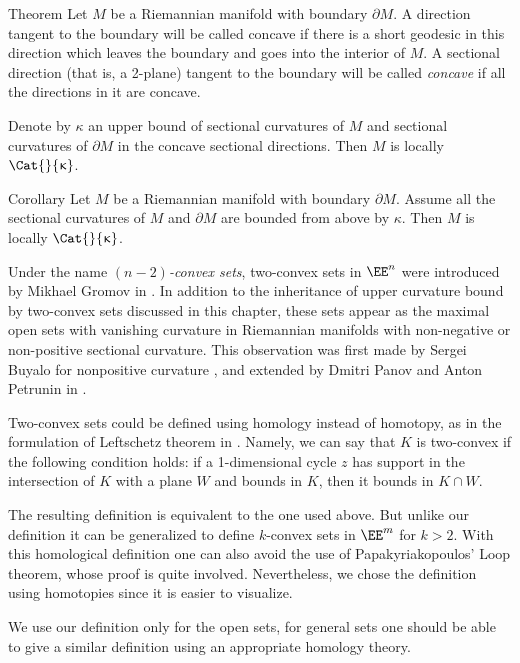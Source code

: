 \begin{thm}{Theorem}
Let $M$ be a Riemannian manifold with boundary $\partial M$.
A direction tangent to the boundary will be called concave if there is a short geodesic in this direction which leaves the boundary and goes into the interior of $M$.
A sectional direction (that is, a 2-plane) 
tangent to the boundary 
will be called \emph{concave} if all the directions in it are concave.

Denote by $\kappa$ an upper bound of sectional curvatures of $M$ and  
sectional curvatures of $\partial M$ in the concave sectional directions. 
Then $M$ is locally $\Cat{}{\kappa}$. 
\end{thm}

\begin{thm}{Corollary}
Let $M$ be a Riemannian manifold with boundary $\partial M$. 
Assume all the sectional curvatures of $M$ and $\partial M$ are bounded from above by $\kappa$.
Then $M$ is locally $\Cat{}{\kappa}$.
\end{thm}

Under the name \emph{$(n-2)$-convex sets}, 
two-convex sets in $\EE^n$ were introduced by Mikhael Gromov in \cite{gromov:SaGMC}.
In addition to the inheritance of upper curvature bound by two-convex sets discussed in this chapter, 
these sets appear as the maximal open sets with vanishing curvature in  Riemannian manifolds with non-negative or non-positive sectional curvature.
This observation was first made by Sergei Buyalo for nonpositive curvature \cite[Lemma 5.8]{buyalo}, 
and extended by Dmitri Panov and Anton Petrunin in \cite{panov-petrunin:sweeping}.

Two-convex sets could be defined using homology instead of homotopy, as in the formulation of Leftschetz theorem in \cite[\S\textonehalf]{gromov:SaGMC}.
Namely, we can say that $K$ is two-convex if the following condition holds: if a 1-dimensional cycle $z$ has support in the intersection of $K$ with a plane $W$ and bounds in $K$, then it bounds in $K\cap W$.

The resulting definition is equivalent to the one used above.
 But unlike our definition it can be generalized to define $k$-convex sets in $\EE^m$ for $k>2$.
With this homological definition one can also avoid the use of Papakyriakopoulos' Loop theorem, whose proof is quite involved.
Nevertheless, we chose the definition using homotopies  since it is easier to visualize.

We use our definition only for the open sets, for general sets one should be able to give a similar definition using  an appropriate  homology theory.




